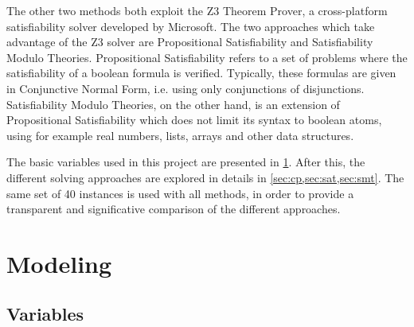 \documentclass[a4paper, 12pt]{article}
\begin{document}
The other two methods both exploit the Z3 Theorem Prover, a cross-platform satisfiability solver developed by Microsoft. The two approaches which take advantage of the Z3 solver are Propositional Satisfiability and Satisfiability Modulo Theories. Propositional Satisfiability refers to a set of problems where the satisfiability of a boolean formula is verified. Typically, these formulas are given in Conjunctive Normal Form, i.e. using only conjunctions of disjunctions. Satisfiability Modulo Theories, on the other hand, is an extension of Propositional Satisfiability which does not limit its syntax to boolean atoms, using for example real numbers, lists, arrays and other data structures.

The basic variables used in this project are presented in \cref{sec:modeling}. After this, the different solving approaches are explored in details in \cref{sec:cp,sec:sat,sec:smt}. The same set of 40 instances is used with all methods, in order to provide a transparent and significative comparison of the different approaches.


\clearpage


\section{Modeling}\label{sec:modeling}


\subsection{Variables}
\end{document}

